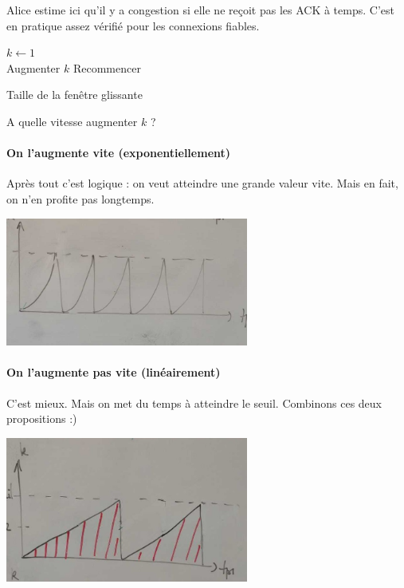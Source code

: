 \begin{rem}
	Alice estime ici qu'il y a congestion si elle ne reçoit pas les ACK à temps. C'est en pratique assez vérifié pour les connexions fiables. 
\end{rem}

\begin{algorithm}[H]
	$k \gets 1$\\
	{Augmenter $k$}
	Recommencer
	\caption{Taille de la fenêtre glissante}
\end{algorithm}

A quelle vitesse augmenter $k$ ?

\paragraph{On l'augmente vite (exponentiellement)}
\enspace
\begin{com}
	Après tout c'est logique : on veut atteindre une grande valeur vite. Mais en fait, on n'en profite pas longtemps. 
\end{com}

\begin{center}
	\includegraphics[width = 8cm]{Developpements/TCP/schema1.jpeg} \\
\end{center}

\paragraph{On l'augmente pas vite (linéairement)}
\enspace
\begin{com}
	C'est mieux. Mais on met du temps à atteindre le seuil. Combinons ces deux propositions :)
\end{com}

\begin{center}
	\includegraphics[width = 8cm]{Developpements/TCP/schema2.jpeg} \\
\end{center}


